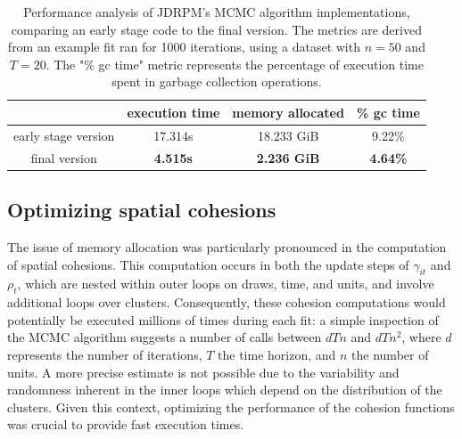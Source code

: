 \documentclass[12pt,	%
	a4paper,		%
	twoside,		%
	openright,		%
	titlepage,%
	]{book}
\theoremstyle{definition}
\begin{document}
\begin{table}[!htb]
    \caption[Comparison of JDRPM's MCMC algorithm implementations]{Performance analysis of JDRPM's MCMC algorithm implementations, comparing an early stage code to the final version. The metrics are derived from an example fit ran for 1000 iterations, using a dataset with $n=50$ and $T=20$. The "\% gc time" metric represents the percentage of execution time spent in garbage collection operations.}
    \centering
    \begin{tabular}{cccc}
    \toprule
    & execution time & memory allocated & \% gc time \\
   \midrule
        early stage version & 17.314s & 18.233 GiB & 9.22\%\\
        final version &\textbf{ 4.515s} & \textbf{2.236 GiB} & \textbf{4.64\%}\\
        \bottomrule
    \end{tabular}
    \label{tab: perf comparison memory management jopt}
\end{table}

\subsection{Optimizing spatial cohesions}

The issue of memory allocation was particularly pronounced in the computation of spatial cohesions. This computation occurs in both the update steps of $\gamma_{it}$ and $\rho_t$, which are nested within outer loops on draws, time, and units, and involve additional loops over clusters. Consequently, these cohesion computations would potentially be executed millions of times during each fit: a simple inspection of the MCMC algorithm suggests a number of calls between $dTn$ and $dTn^2$, where $d$ represents the number of iterations, $T$ the time horizon, and $n$ the number of units. A more precise estimate is not possible due to the variability and randomness inherent in the inner loops which depend on the distribution of the clusters. Given this context, optimizing the performance of the cohesion functions was crucial to provide fast execution times.
\end{document}
